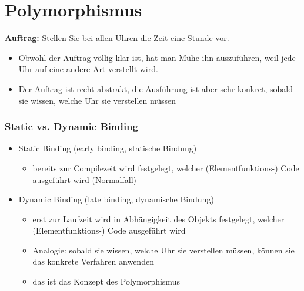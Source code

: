 
\part{Polymorphismus}
\textbf{Auftrag:} Stellen Sie bei allen Uhren die Zeit eine Stunde vor.
\begin{itemize}
	\item Obwohl der Auftrag völlig klar ist, hat man Mühe ihn auszuführen, weil jede Uhr auf eine andere Art verstellt wird.
	\item Der Auftrag ist recht abstrakt, die Ausführung ist aber sehr konkret, sobald sie wissen, welche Uhr sie verstellen müssen
\end{itemize}

\section{Static vs. Dynamic Binding}
\begin{itemize}
	\item Static Binding (early binding, statische Bindung)
	\begin{itemize}
		\item bereits zur Compilezeit wird festgelegt, welcher (Elementfunktions-) Code ausgeführt wird (Normalfall)
	\end{itemize}
	\item Dynamic Binding (late binding, dynamische Bindung)
	\begin{itemize}
		\item erst zur Laufzeit wird in Abhängigkeit des Objekts festgelegt, welcher (Elementfunktions-) Code ausgeführt wird
		\item Analogie: sobald sie wissen, welche Uhr sie verstellen müssen, können sie das konkrete Verfahren anwenden
		\item das ist das Konzept des Polymorphismus
	\end{itemize}
\end{itemize}

